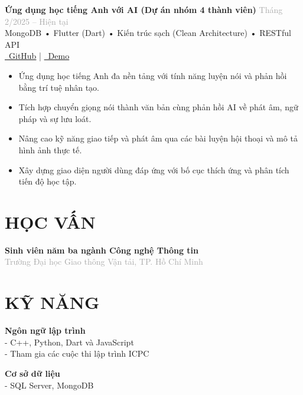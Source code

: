\documentclass[10pt,a4paper]{article}
\newcommand{\projectitem}[5]{%
    \noindent\begin{tcolorbox}[
        colback=white,
        colframe=lightgray,
        boxrule=0.3pt,
        arc=2pt,
        top=3pt,
        bottom=3pt,
        left=6pt,
        right=6pt
    ]
        \noindent\textbf{\color{primary}#1} \hfill \textcolor{darkgray}{\scriptsize#2}\\[1pt]
        {\small\color{secondary}#3}\\[1pt]
        {\scriptsize\color{darkgray}#4}\\[3pt]
        #5
    \end{tcolorbox}
}
\begin{document}
\vspace{3pt}

\projectitem{Ứng dụng học tiếng Anh với AI (Dự án nhóm 4 thành viên)}{Tháng 2/2025 -- Hiện tại}
    {MongoDB • Flutter (Dart) • Kiến trúc sạch (Clean Architecture) • RESTful API}
    {\href{https://github.com/dungken/speaking_english_with_ai_app}{\textcolor{secondary}{\faGithub\ GitHub}} | \href{YOUR_YOUTUBE_DEMO_LINK}{\textcolor{secondary}{\faYoutube\ Demo}}}
    {\begin{itemize}[leftmargin=12pt,itemsep=1pt,parsep=0pt,topsep=0pt,after=\vspace{-2pt},label={•}]
        \item Ứng dụng học tiếng Anh đa nền tảng với tính năng luyện nói và phản hồi bằng trí tuệ nhân tạo.
        \item Tích hợp chuyển giọng nói thành văn bản cùng phản hồi AI về phát âm, ngữ pháp và sự lưu loát.
        \item Nâng cao kỹ năng giao tiếp và phát âm qua các bài luyện hội thoại và mô tả hình ảnh thực tế.
        \item Xây dựng giao diện người dùng đáp ứng với bố cục thích ứng và phân tích tiến độ học tập.
    \end{itemize}}

\vspace{6pt}

\section{HỌC VẤN}
\noindent\textbf{Sinh viên năm ba ngành Công nghệ Thông tin} \hfill \textcolor{darkgray}{\small}\\[1pt]
\textcolor{darkgray}{\small Trường Đại học Giao thông Vận tải, TP. Hồ Chí Minh}

\vspace{6pt}

\section{KỸ NĂNG}
\begin{minipage}[t]{0.5\textwidth}
    \textbf{\small Ngôn ngữ lập trình} \\[1pt]
    - C++, Python, Dart và JavaScript \\
    - Tham gia các cuộc thi lập trình ICPC \\
\end{minipage}%
\begin{minipage}[t]{0.5\textwidth}
    \textbf{\small Cơ sở dữ liệu} \\[1pt]
    - SQL Server, MongoDB
\end{minipage}
\end{document}
